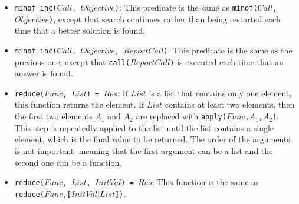 \begin{itemize}
\item \texttt{minof\_inc($Call$, $Objective$)}: This predicate is the same as \texttt{minof($Call$,$Objective$)}, except that search continues rather than being restarted each time that a better solution is found.
\item \texttt{minof\_inc($Call$, $Objective$, $ReportCall$)}: This predicate is the same as the previous one, except that \texttt{call($ReportCall$)} is executed each time that an answer is found.
\item \texttt{reduce($Func$, $List$) = $Res$}: If $List$ is a list that contains only one element, this function returns the element. If $List$ contains at least two elements, then the first two elements $A_1$ and $A_2$ are replaced with \texttt{apply($Func$,$A_1$,$A_2$)}. This step is repeatedly applied to the list until the list contains a single element, which is the final value to be returned. The order of the arguments is not important, meaning that the first argument can be a list and the second one can be a function.
\item \texttt{reduce($Func$, $List$, $InitVal$) = $Res$}: This function is the same as\\
 \texttt{reduce($Func$,[$InitVal$$|$$List$])}.
\end{itemize}


